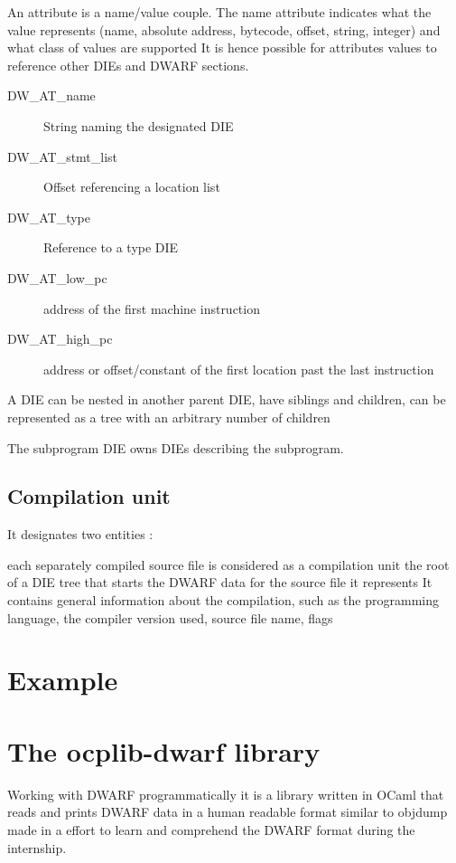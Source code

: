 An attribute is a name/value couple.
The name attribute indicates what the value represents (name, absolute address,
bytecode, offset, string, integer) and what class of values are supported
It is hence possible for attributes values to reference other DIEs and DWARF sections.

\begin{description}
    \item[DW\_AT\_name] String naming the designated DIE
    \item[DW\_AT\_stmt\_list] Offset referencing a location list
    \item[DW\_AT\_type] Reference to a type DIE
    \item[DW\_AT\_low\_pc] address of the first machine instruction
    \item[DW\_AT\_high\_pc] address or offset/constant of the first location past the last instruction
\end{description}

A DIE can be nested in another parent DIE, have siblings and children,
can be represented as a tree with an arbitrary number of children

The subprogram DIE owns DIEs describing the subprogram.

\subsection{Compilation unit}

It designates two entities :

each separately compiled source file is considered as a compilation unit
the root of a DIE tree that starts the DWARF data for the source file it represents
It contains general information about the compilation,
such as the programming language, the compiler version used, source file name, flags

\section{Example}

\section{The ocplib-dwarf library}

Working with DWARF programmatically
it is a library written in OCaml that reads and prints DWARF data in a human readable format similar to objdump
made in a effort to learn and comprehend the DWARF format during the internship.

